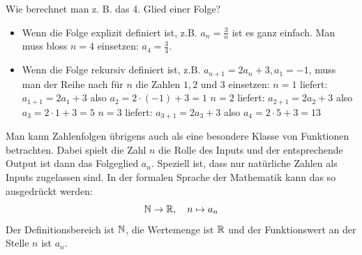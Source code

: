 \begin{bsp}
    {Wie berechnet man z. B. das 4. Glied einer Folge?}{}
   
    \begin{itemize}
         
        \item 	Wenn die Folge explizit definiert ist,
         z.B. $a_n=\frac{3}{n}$ ist es ganz einfach. Man muss bloss $n=4$ einsetzen:
          $a_4=\frac{3}{4}$.
        \item 	Wenn die Folge rekursiv definiert ist, z.B. $a_{n+1}= 2a_n + 3, a_1=-1$,
        muss man der Reihe nach für $n$ die Zahlen $1,2$ und $3$ einsetzen: \newline
        $n=1$ liefert: $a_{1+1}=2a_1+3$ also $a_2=2\cdot (-1)+3=1$  \newline
        $n=2$ liefert: $a_{2+1}=2a_2+3$ also $a_3=2\cdot 1+3=5$  \newline
        $n=3$ liefert: $a_{3+1}=2a_3+3$ also $a_4=2\cdot 5+3=13$ 
        
    \end{itemize}
\end{bsp}
Man kann Zahlenfolgen übrigens auch als eine besondere Klasse von Funktionen betrachten.
Dabei spielt die Zahl $n$ die Rolle des Inputs und der entsprechende Output ist dann das Folgeglied $a_n$.
Speziell ist, dass nur natürliche Zahlen als Inputs zugelassen sind. In der formalen Sprache der Mathematik kann das so ausgedrückt werden:
$$ \mathbb{N} \rightarrow \mathbb{R}, \quad n \mapsto a_n $$
Der Definitionsbereich ist $\mathbb{N}$, die Wertemenge ist $\mathbb{R}$ und der Funktionswert an der Stelle $n$ ist $a_n$.

